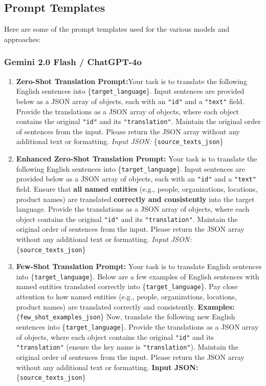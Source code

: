 \documentclass{ecai}
\begin{document}
\subsection{Prompt Templates}

Here are some of the prompt templates used for the various models and approaches:

\subsubsection{Gemini 2.0 Flash / ChatGPT-4o}


\begin{enumerate}
    \item \textbf{Zero-Shot Translation Prompt:}Your task is to translate the following English sentences into \{\texttt{target\_language}\}. Input sentences are provided below as a JSON array of objects, each with an \texttt{"id"} and a \texttt{"text"} field. Provide the translations as a JSON array of objects, where each object contains the original \texttt{"id"} and its \texttt{"translation"}. Maintain the original order of sentences from the input. Please return the JSON array without any additional text or formatting. \textit{Input JSON:} \{\texttt{source\_texts\_json}\}
    \item \textbf{Enhanced Zero-Shot Translation Prompt:} Your task is to translate the following English sentences into \{\texttt{target\_language}\}. Input sentences are provided below as a JSON array of objects, each with an \texttt{"id"} and a \texttt{"text"} field. Ensure that \textbf{all named entities} (e.g., people, organizations, locations, product names) are translated \textbf{correctly and consistently} into the target language. Provide the translations as a JSON array of objects, where each object contains the original \texttt{"id"} and its \texttt{"translation"}. Maintain the original order of sentences from the input. Please return the JSON array without any additional text or formatting. \textit{Input JSON:} \{\texttt{source\_texts\_json}\}
    \item \textbf{Few-Shot Translation Prompt:} Your task is to translate English sentences into \{\texttt{target\_language}\}. Below are a few examples of English sentences with named entities translated correctly into \{\texttt{target\_language}\}. Pay close attention to how named entities (e.g., people, organizations, locations, product names) are translated correctly and consistently. \textbf{Examples:} \{\texttt{few\_shot\_examples\_json}\} Now, translate the following new English sentences into \{\texttt{target\_language}\}. Provide the translations as a JSON array of objects, where each object contains the original \texttt{"id"} and its \texttt{"translation"} (ensure the key name is \texttt{"translation"}). Maintain the original order of sentences from the input. Please return the JSON array without any additional text or formatting. \textbf{Input JSON:} \{\texttt{source\_texts\_json}\}

\end{enumerate}
\end{document}
